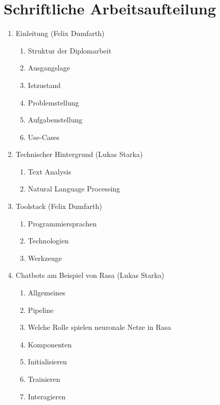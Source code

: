 
\renewcommand{\labelenumii}{\arabic{enumi}.\arabic{enumii}}
\renewcommand{\labelenumiii}{\arabic{enumi}.\arabic{enumii}.\arabic{enumiii}}
\renewcommand{\labelenumiv}{\arabic{enumi}.\arabic{enumii}.\arabic{enumiii}.\arabic{enumiv}}

\section{Schriftliche Arbeitsaufteilung}

\begin{enumerate}
    \item Einleitung (Felix Dumfarth)
    \begin{enumerate}
        \item Struktur der Diplomarbeit
        \item Ausgangslage
        \item Istzustand
        \item Problemstellung
        \item Aufgabenstellung
        \item Use-Cases
    \end{enumerate}
    \item Technischer Hintergrund (Lukas Starka)
    \begin{enumerate}
        \item Text Analysis
        \item Natural Language Processing
    \end{enumerate}
    \item Toolstack (Felix Dumfarth)
    \begin{enumerate}
        \item Programmiersprachen
        \item Technologien
        \item Werkzeuge
    \end{enumerate}
    \item Chatbots am Beispiel von Rasa (Lukas Starka)
    \begin{enumerate}
        \item Allgemeines
        \item Pipeline
        \item Welche Rolle spielen neuronale Netze in Rasa
        \item Komponenten
        \item Initialisieren
        \item Trainieren
        \item Interagieren

\end{enumerate}
\end{enumerate}
